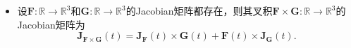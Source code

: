 \begin{itemize}
\begin{equation*}
   \end{equation*}
   其中$f_i,g_i : \mathbb{R}^{n} \rightarrow \mathbb{R}$,的导数为
	\begin{equation*}
		\nabla \left( \langle \mathbf{F}(x), \mathbf{G}(x) \rangle \right) = \mathbf{F}^{\top}(x) \mathbf{J}_{\mathbf{G}}(x) + \mathbf{G}^{\top}(x) \mathbf{J}_{\mathbf{F}}(x).
	\end{equation*}
  	\item[$(6)$] 设$\mathbf{F} : \mathbb{R} \rightarrow \mathbb{R}^{3}$和$\mathbf{G}: \mathbb{R} \rightarrow \mathbb{R}^{3}$的Jacobian矩阵都存在，则其叉积$\mathbf{F} \times \mathbf{G} : \mathbb{R} \rightarrow \mathbb{R}^{3}$的Jacobian矩阵为
	\begin{equation*}
		\mathbf{J}_{ \mathbf{F} \times \mathbf{G} } (t)  = \mathbf{J}_{\mathbf{F}}(t) \times \mathbf{G}(t) + \mathbf{F}(t) \times \mathbf{J}_{\mathbf{G}}(t).
	\end{equation*}
\end{itemize}

